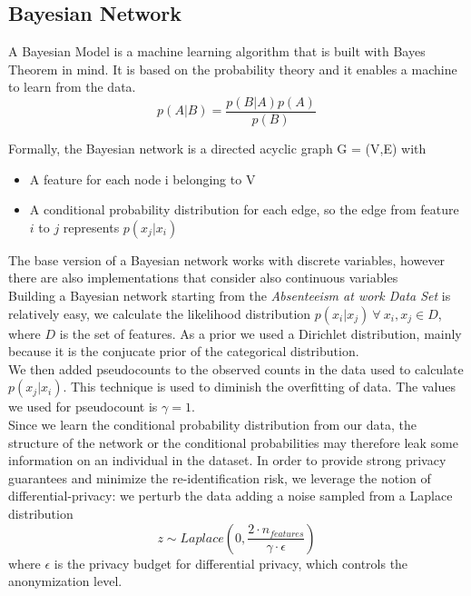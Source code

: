 \subsection{Bayesian Network}
A Bayesian Model is a machine learning algorithm that is built with Bayes Theorem in mind.  It is based on the probability theory and it enables a machine to learn from the data.
\begin{equation*}
    p(A|B) = \frac{p(B|A)p(A)}{p(B)}
\end{equation*}

Formally, the Bayesian network is a directed acyclic graph G = (V,E) with
\begin{itemize}
    \item A feature for each node i belonging to V
    \item A conditional probability distribution for each edge, so the edge from feature $i$ to $j$ represents $p(x_j| x_i)$
  \end{itemize}
The base version of a Bayesian network works with discrete variables, however there are also implementations that consider also continuous variables \cite{chen2017learning} \\
Building a Bayesian network starting from the \textit{Absenteeism at work Data Set} is relatively easy, we calculate the likelihood distribution $p(x_i|x_j)\:\forall\:x_i, x_j \in D$, where $D$ is the set of features. As a prior we used a Dirichlet distribution, mainly because it is the conjucate prior of the categorical distribution. \\
We then added pseudocounts to the observed counts in the data used to calculate $p(x_j| x_i)$. This technique is used to diminish the overfitting of data. The values we used for pseudocount is $\gamma=1$. \\
Since we learn the conditional probability distribution from our data, the structure of the network or the conditional probabilities may therefore leak some information on an individual in the dataset. In order to provide strong privacy guarantees and minimize the re-identification risk, we leverage the notion of differential-privacy: we perturb the data adding a noise sampled from a Laplace distribution 
\begin{equation*}
    z \sim Laplace \left(0, \frac{2 \cdot n_{features}}{\gamma \cdot \epsilon} \right)
\end{equation*}
where $\epsilon$ is the privacy budget for differential privacy, which controls the anonymization level. \\
